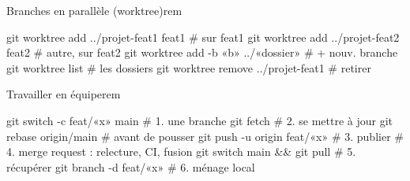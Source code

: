 \documentclass{article}
\begin{document}
\begin{colonne}
\begin{bloc}{Branches en parallèle (worktree)}{rem}
\begin{code}
git worktree add ../projet-feat1 feat1  # sur feat1
git worktree add ../projet-feat2 feat2  # autre, sur feat2
git worktree add -b «b» ../«dossier»        # + nouv. branche
git worktree list                       # les dossiers
git worktree remove ../projet-feat1     # retirer
\end{code}
\end{bloc}

\begin{bloc}{Travailler en équipe}{rem}
\begin{code}
git switch -c feat/«x» main         # 1. une branche
git fetch                         # 2. se mettre à jour
git rebase origin/main            #    avant de pousser
git push -u origin feat/«x»         # 3. publier
# 4. merge request : relecture, CI, fusion
git switch main && git pull       # 5. récupérer
git branch -d feat/«x»              # 6. ménage local
\end{code}
\end{bloc}
\end{colonne}
\end{document}
